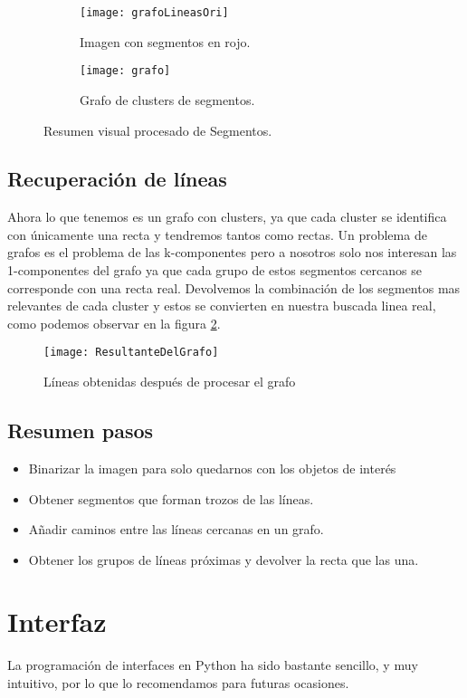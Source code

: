\begin{figure}
\begin{subfigure}[b]{.5\linewidth}
\centering\large \texttt{[image: grafoLineasOri]}
\caption{Imagen con segmentos en rojo.}
\end{subfigure}
\begin{subfigure}[b]{.5\linewidth}
\centering\large \texttt{[image: grafo]}
\caption{Grafo de clusters de segmentos.}
\end{subfigure}
\caption{Resumen visual procesado de Segmentos.}\label{fig:5.6}
\end{figure}

\subsection{Recuperación de líneas}
Ahora lo que tenemos es un grafo con clusters, ya que cada cluster se identifica con únicamente una recta y tendremos tantos como rectas.
Un problema de grafos es el problema de las k-componentes pero a nosotros solo nos interesan las 1-componentes del grafo ya que cada grupo de estos segmentos cercanos se corresponde con una recta real.
Devolvemos la combinación de los segmentos mas relevantes de cada cluster y estos se convierten en nuestra buscada linea real, como podemos observar en la figura \ref{fig:5.7}.
\begin{figure}[h]
\centering
\texttt{[image: ResultanteDelGrafo]}
\caption{Líneas obtenidas después de procesar el grafo}
\label{fig:5.7}
\end{figure}

\subsection{Resumen pasos}

\begin{itemize}
\item Binarizar la imagen para solo quedarnos con los objetos de interés
\item Obtener segmentos que forman trozos de las líneas.
\item Añadir caminos entre las líneas cercanas en un grafo.
\item Obtener los grupos de líneas próximas y devolver la recta que las una. 
\end{itemize}

\section{Interfaz}
La programación de interfaces en Python ha sido bastante sencillo, y muy intuitivo, por lo que lo recomendamos para futuras ocasiones.

